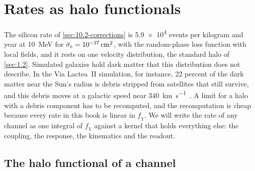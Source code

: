 \section{Rates as halo functionals}\label{sec:21.1}

The silicon rate of \cref{sec:10.2-corrections} is \num{5.9e4} events per kilogram and year at \SI{10}{MeV} for $\bar{\sigma}_{e} = \SI{e-37}{cm^2}$, with the random-phase loss function with local fields, and it rests on one velocity distribution, the standard halo of \cref{sec:1.2}. Simulated galaxies hold dark matter that this distribution does not describe. In the Via Lactea~II simulation, for instance, 22 percent of the dark matter near the Sun's radius is debris stripped from satellites that still survive, and this debris moves at a galactic speed near \SI{340}{km.s^{-1}}~\cite{kuhlen2012direct}. A limit for a halo with a debris component has to be recomputed, and the recomputation is cheap because every rate in this book is linear in $f_\chi$. We will write the rate of any channel as one integral of $f_\chi$ against a kernel that holds everything else: the coupling, the response, the kinematics and the readout.

\subsection{The halo functional of a channel}\label{sec:21.1-functional}

